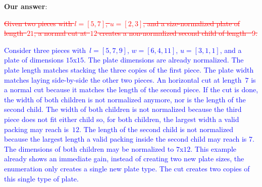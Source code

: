 \documentclass[smallextended]{svjour3}       %
\makeatletter
\newif\iffinalversion
\newcommand{\newtext}[1]{\iffinalversion%
#1%
\else%
\textcolor{blue}{#1}%
\fi%
}
\newcommand{\oldtext}[1]{\iffinalversion%
#1%
\else%
\textcolor{red}{\sout{#1}}%
\fi%
}
\newcommand\gobblepars{%
    \@ifnextchar\par%
        {\expandafter\gobblepars\@gobble}%
        {}}
\newcounter{answer}
\newenvironment{answer}{%
    \refstepcounter{answer}\par\smallskip\noindent%
    \textbf{Our answer}: \gobblepars}%
    {\unskip\bigskip}
\makeatother
\begin{document}
\begin{answer}
\begin{example}\label{ex:renormalization_after_cut}
\oldtext{Given two pieces with \(l = [5, 7]\), \(u = [2, 3]\), and a size-normalized plate of length~\(21\), a normal cut at~\(12\) creates a non-normalized second child of length~ \(9\).}
\newtext{Consider three pieces with~\(l = [5, 7, 9]\), \(w = [6, 4, 11]\), \(u = [3, 1, 1]\), and a plate of dimensions \(15\)x\(15\). The plate dimensions are already normalized. The plate length matches stacking the three copies of the first piece. The plate width matches laying side-by-side the other two pieces. An horizontal cut at length~\(7\) is a normal cut because it matches the length of the second piece. If the cut is done, the width of both children is not normalized anymore, nor is the length of the second child. The width of both children is not normalized because the third piece does not fit either child so, for both children, the largest width a valid packing may reach is~\(12\). The length of the second child is not normalized because the largest length a valid packing inside the second child may reach is 7. The dimensions of both children may be normalized to \(7\)x\(12\). This example already shows an immediate gain, instead of creating two new plate sizes, the enumeration only creates a single new plate type. The cut creates two copies of this single type of plate.}
\end{example}

\begin{figure}[ht]
\center
{}
\end{figure}
\end{answer}
\end{document}
